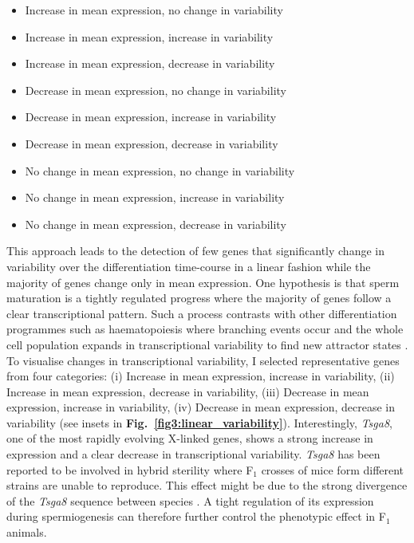 \begin{itemize}
\itemsep0em 
\item Increase in mean expression, no change in variability
\item Increase in mean expression, increase in variability
\item Increase in mean expression, decrease in variability
\item Decrease in mean expression, no change in variability
\item Decrease in mean expression, increase in variability
\item Decrease in mean expression, decrease in variability
\item No change in mean expression, no change in variability
\item No change in mean expression, increase in variability
\item No change in mean expression, decrease in variability
\end{itemize}

This approach leads to the detection of few genes that significantly change in variability over the differentiation time-course in a linear fashion while the majority of genes change only in mean expression. One hypothesis is that sperm maturation is a tightly regulated progress where the majority of genes follow a clear transcriptional pattern. Such a process contrasts with other differentiation programmes such as haematopoiesis where branching events occur and the whole cell population expands in transcriptional variability to find new attractor states \citep{Mojtahedi2016}. To visualise changes in transcriptional variability, I selected representative genes from four categories: (i) Increase in mean expression, increase in variability, (ii) Increase in mean expression, decrease in variability, (iii) Decrease in mean expression, increase in variability, (iv) Decrease in mean expression, decrease in variability (see insets in \textbf{Fig.~\ref{fig3:linear_variability}}). Interestingly, \textit{Tsga8}, one of the most rapidly evolving X-linked genes, shows a strong increase in expression and a clear decrease in transcriptional variability. \emph{Tsga8} has been reported to be involved in hybrid sterility where F$_1$ crosses of mice form different strains are unable to reproduce. This effect might be due to the strong divergence of the \emph{Tsga8} sequence between species \citep{Good2011}. A tight regulation of its expression during spermiogenesis can therefore further control the phenotypic effect in F$_1$ animals.

